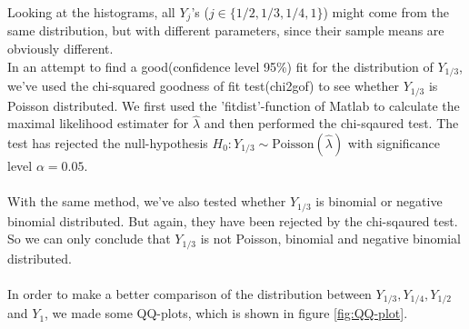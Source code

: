 Looking at the histograms, all $Y_j$'s ($j\in \{1/2,1/3,1/4,1\}$) might come from the same distribution, but with different parameters, since their sample means are obviously different.\\
In an attempt to find a good(confidence level 95\%) fit for the distribution of $Y_{1/3}$, we've used the chi-squared goodness of fit test(chi2gof) to see whether $Y_{1/3}$ is Poisson distributed. We first used the 'fitdist'-function of Matlab to calculate the maximal likelihood estimater for $\hat{\lambda}$ and then performed the chi-sqaured test. The test has rejected the null-hypothesis $H_0:Y_{1/3}\sim\text{Poisson}(\hat{\lambda})$ with significance level $\alpha=0.05$. \\   
\\
With the same method, we've also tested whether $Y_{1/3}$ is binomial or negative binomial distributed. But again, they have been rejected by the chi-sqaured test. So we can only conclude that $Y_{1/3}$ is not Poisson, binomial and negative binomial distributed.\\
\\
In order to make a better comparison of the distribution between $Y_{1/3},Y_{1/4},Y_{1/2}$ and $Y_1$, we made some QQ-plots, which is shown in figure \ref{fig:QQ-plot}.\\ 
